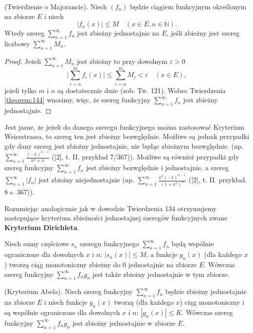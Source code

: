 \documentclass[leqno]{article}
\begin{document}
\begin{justify}
\begin{theorem}
{
    (Twierdzenie o Majorancie). Niech $(f_n)$ będzie ciągiem funkcyjnym określonym na zbiorze $E$ i niech
    \[
        |f_n(x)| \leqslant M \quad (x \in E, n \in \mathbb{N}).
    \]
    Wtedy szereg $\sum\limits_{n=1}^{\infty}f_n$ jest zbieżny jednostajnie na $E$, jeśli zbieżny jest 
    szereg liczbowy $\sum\limits_{n=1}^{\infty}M_n$.
}
\end{theorem}

\begin{proof}
    Jeżeli $\sum\limits_{n=1}^{\infty}M_n$ jest zbieżny to przy dowolnym $\varepsilon > 0$
    \[
        \Bigg|\sum\limits_{i=n}^{m}f_i(x)\Bigg| \leqslant \sum\limits_{i=n}^{m}M_i < \varepsilon \quad (x \in E),
    \]
    jeżeli tylko $m$ i $n$ są dostatecznie duże (zob. Tw. 121). Wobec Twierdzenia \ref{theorem:144} wnosimy, 
    więc, że szereg funkcyjny $\sum\limits_{n=1}^{\infty}f_n$ jest zbieżny jednostajnie.
\end{proof}

\begin{uwaga}
    Jest jasne, że jeżeli do danego szeregu funkcyjnego można zastosować Kryterium Weierstrassa, to szereg ten
    jest zbieżny bezwględnie. Możliwe są jednak przypadki gdy dany szereg jest zbieżny jednostajnie, nie będąc zbieżnym bezwględnie.
    (np. $\sum\limits_{n=1}^{\infty}\frac{(-1)^{n-1}}{x^2+n}$ ([2], t. II, przykład 7/367)). Możliwe są również przypadki gdy szereg
    funkcyjny $\sum\limits_{n=1}^{\infty}f_n$ jest zbieżny bezwględnie i jednostajnie, a szereg $\sum\limits_{n=1}^{\infty}|f_n|$ jest zbieżny
    niejednostajnie (np. $\sum\limits_{n=1}^{\infty}\frac{x^2(-1)^{n-1}}{{(1+x^2)}^n}$ ([2], t. II. przykład. 8 s. 367)).
\end{uwaga}

Rozumiejąc analogicznie jak w dowodzie Twierdzenia 134 otrzymujemy nastepujące kryterium zbieżności jednostajnej szeregów funkcyjnych zwane
\textbf{Kryterium Dirichleta}.

\begin{theorem}
{
    Niech sumy częściowe $s_n$ szeregu funkcyjnego $\sum\limits_{n=1}^{\infty}f_n$ będą wspólnie ograniczone dla dowolnych $x$ i $n$: 
    $|s_n(x)| \leqslant M$, a funkcje $g_n(x)$ (dla każdego $x$) tworzą ciąg monotoniczny zbieżny do $0$ jednostajnie na zbiorze $E$.
    Wówczas szereg funkcyjny $\sum\limits_{n=1}^{\infty}f_n g_n$ jest także zbieżny jednostajnie w tym zbiorze.
}
\end{theorem}

\begin{theorem}
{
    (Kryterium Abela). Niech szereg funkcyjny $\sum\limits_{n=1}^{\infty}f_n$
    będzie zbieżny jednostajnie na zbiorze $E$ i niech funkcje $g_n(x)$ tworzą (dla każdego $x$) ciąg monotoniczny
    i są wspólnie ograniczone dla dowolnych $x$ i $n$: $|g_n(x)| \leqslant K$. Wówczas szereg
    funkcyjny $\sum\limits_{n=1}^{\infty} f_n g_n$ jest zbieżny jednostajnie w zbiorze $E$.
}
\end{theorem}


\end{justify}
\end{document}
